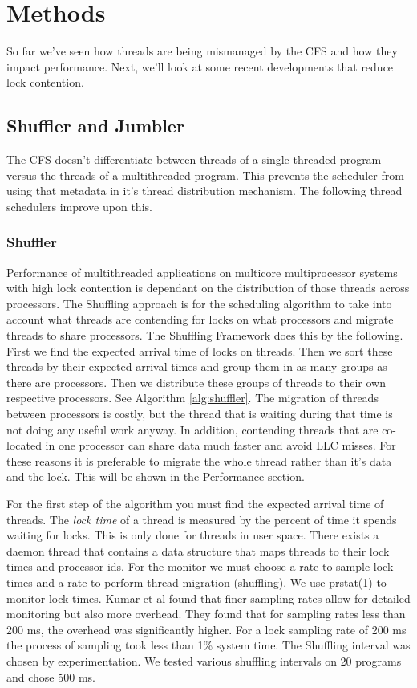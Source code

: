 \documentclass{sig-alternate}
\begin{document}
\section{Methods}
\label{sec:methods}

So far we've seen how threads are being mismanaged by the CFS and how they impact performance. Next, we'll look at some recent developments that reduce lock contention.

\subsection{Shuffler and Jumbler}
\label{sec:sj}

The CFS doesn't differentiate between threads of a single-threaded program versus the threads of a multithreaded program. This prevents the scheduler from using that metadata in it's thread distribution mechanism. The following thread schedulers improve upon this.

\subsubsection{Shuffler}
\label{sec:shuffler}

Performance of multithreaded applications on multicore multiprocessor systems with high lock contention is dependant on the distribution of those threads across processors. The Shuffling approach is for the scheduling algorithm to take into account what threads are contending for locks on what processors and migrate threads to share processors. The Shuffling Framework does this by the following. First we find the expected arrival time of locks on threads. Then we sort these threads by their expected arrival times and group them in as many groups as there are processors. Then we distribute these groups of threads to their own respective processors. See Algorithm \ref{alg:shuffler}. The migration of threads between processors is costly, but the thread that is waiting during that time is not doing any useful work anyway. In addition, contending threads that are co-located in one processor can share data much faster and avoid LLC misses. For these reasons it is preferable to migrate the whole thread rather than it's data and the lock. This will be shown in the Performance section.\cite{KumarEtal:2014}

For the first step of the algorithm you must find the expected arrival time of threads. The \textit{lock time} of a thread is measured by the percent of time it spends waiting for locks. This is only done for threads in user space. There exists a daemon thread that contains a data structure that maps threads to their lock times and processor ids. For the monitor we must choose a rate to sample lock times and a rate to perform thread migration (shuffling). We use prstat(1) to monitor lock times. Kumar et al found that finer sampling rates allow for detailed monitoring but also more overhead. They found that for sampling rates less than 200 ms, the overhead was significantly higher. For a lock sampling rate of 200 ms the process of sampling took less than 1\% system time. The Shuffling interval was chosen by experimentation. We tested various shuffling intervals on 20 programs and chose 500 ms.
\end{document}
